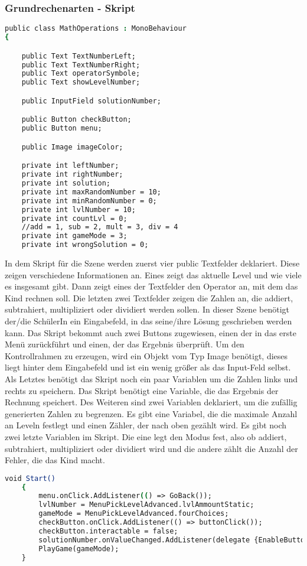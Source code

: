 \subsubsection{Grundrechenarten - Skript}
\begin{lstlisting}[language=csh, caption={MathOperations.cs Variablen-Deklaration}]
public class MathOperations : MonoBehaviour
{

	public Text TextNumberLeft;
	public Text TextNumberRight;
	public Text operatorSymbole;
	public Text showLevelNumber;

	public InputField solutionNumber;

	public Button checkButton;
	public Button menu;

	public Image imageColor;

	private int leftNumber;
	private int rightNumber;
	private int solution;
	private int maxRandomNumber = 10;
	private int minRandomNumber = 0;
	private int lvlNumber = 10;
	private int countLvl = 0;
	//add = 1, sub = 2, mult = 3, div = 4
	private int gameMode = 3;
	private int wrongSolution = 0;
\end{lstlisting}
In dem Skript für die Szene werden zuerst vier public Textfelder deklariert. Diese zeigen verschiedene Informationen an. Eines zeigt das aktuelle Level und wie viele es insgesamt gibt. Dann zeigt eines der Textfelder den Operator an, mit dem das Kind rechnen soll. Die letzten zwei Textfelder zeigen die Zahlen an, die addiert, subtrahiert, multipliziert oder dividiert werden sollen. In dieser Szene benötigt der/die SchülerIn ein Eingabefeld, in das seine/ihre Lösung geschrieben werden kann. Das Skript bekommt auch zwei Buttons zugewiesen, einen der in das erste Menü zurückführt und einen, der das Ergebnis überprüft. Um den Kontrollrahmen zu erzeugen, wird ein Objekt vom Typ Image benötigt, dieses liegt hinter dem Eingabefeld und ist ein wenig größer als das Input-Feld selbst. Als Letztes benötigt das Skript noch ein paar Variablen um die Zahlen links und rechts zu speichern. Das Skript benötigt eine Variable, die das Ergebnis der Rechnung speichert. Des Weiteren sind zwei Variablen deklariert, um die zufällig generierten Zahlen zu begrenzen. Es gibt eine Variabel, die die maximale Anzahl an Leveln festlegt und einen Zähler, der nach oben gezählt wird. Es gibt noch zwei letzte Variablen im Skript. Die eine legt den Modus fest, also ob addiert, subtrahiert, multipliziert oder dividiert wird und die andere zählt die Anzahl der Fehler, die das Kind macht.\\
\begin{lstlisting}[language=csh, caption={MathOperations.cs Start-Funktion}]
	void Start()
	{
		menu.onClick.AddListener(() => GoBack());
		lvlNumber = MenuPickLevelAdvanced.lvlAmmountStatic;
		gameMode = MenuPickLevelAdvanced.fourChoices;
		checkButton.onClick.AddListener(() => buttonClick());
		checkButton.interactable = false;
		solutionNumber.onValueChanged.AddListener(delegate {EnableButton(); });
		PlayGame(gameMode);
	}
\end{lstlisting}
